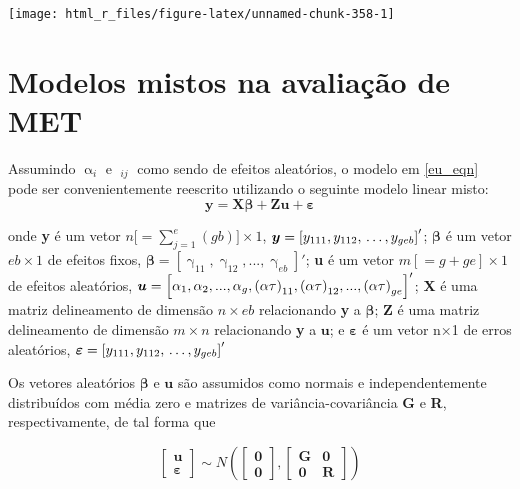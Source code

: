 \documentclass[
]{book}
\numberwithin{equation}{section}
\begin{document}
\begin{center}\texttt{[image: html\_r\_files/figure-latex/unnamed-chunk-358-1]} \end{center}

\hypertarget{modelos-mistos-na-avaliauxe7uxe3o-de-met}{%
\section{Modelos mistos na avaliação de MET}\label{modelos-mistos-na-avaliauxe7uxe3o-de-met}}

Assumindo \(\mathop\alpha\nolimits_i\) e \(\mathop {(\alpha \tau )}\nolimits_{ij}\) como sendo de efeitos aleatórios, o modelo em \ref{eu_eqn} pode ser convenientemente reescrito utilizando o seguinte modelo linear misto:
\[ \label{meq}
{\boldsymbol{y  = X\beta  + Zu + \varepsilon }}
\]

onde \textbf{y} é um vetor \(n[ = \sum\nolimits_{j = 1}^e {(gb)]} \times 1\), \({\boldsymbol{y}} = {\rm{ }}{\left[ {{y_{111}},{\rm{ }}{y_{112}},{\rm{ }} \ldots ,{\rm{ }}{y_{geb}}} \right]^\prime }\); \(\boldsymbol{\beta}\) é um vetor \(eb \times 1\) de efeitos fixos, \({\boldsymbol{\beta }} = [\mathop \gamma \nolimits_{11} ,\mathop \gamma \nolimits_{12} ,...,\mathop \gamma \nolimits_{eb} ]'\); \textbf{u} é um vetor \(m[ = g + ge] \times 1\) de efeitos aleatórios, \({\boldsymbol{u}} = {\rm{ }}{\left[ {{\alpha _1},{\alpha _2},...,{\alpha _g},\mathop {(\alpha \tau )}\nolimits_{11} ,\mathop {(\alpha \tau )}\nolimits_{12} ,...,\mathop {(\alpha \tau )}\nolimits_{ge} } \right]^\prime }\); \textbf{X} é uma matriz delineamento de dimensão \(n \times eb\) relacionando \textbf{y} a \({\boldsymbol{\beta }}\); \textbf{Z} é uma matriz delineamento de dimensão \(m\times n\) relacionando \textbf{y} a \(\boldsymbol{u}\); e \({\boldsymbol{\varepsilon }}\) é um vetor n×1 de erros aleatórios, \({\boldsymbol{\varepsilon }} = {\rm{ }}{\left[ {{y_{111}},{\rm{ }}{y_{112}},{\rm{ }} \ldots ,{\rm{ }}{y_{geb}}} \right]^\prime }\)

Os vetores aleatórios \({\boldsymbol{\beta }}\) e \(\boldsymbol{u}\) são assumidos como normais e independentemente distribuídos com média zero e matrizes de variância-covariância \textbf{G} e \textbf{R}, respectivamente, de tal forma que

\[
\left[ \begin{array}{l}{\boldsymbol{u}}\\{\boldsymbol{\varepsilon }}\end{array} \right]\sim N\left( {\left[ \begin{array}{l}{\boldsymbol{0}}\\{\boldsymbol{0}}\end{array} \right]{\boldsymbol{,}}\left[ {\begin{array}{*{20}{c}}{\boldsymbol{G}}&{\boldsymbol{0}}\\{\boldsymbol{0}}&{\boldsymbol{R}}\end{array}} \right]} \right)
\]
\end{document}

